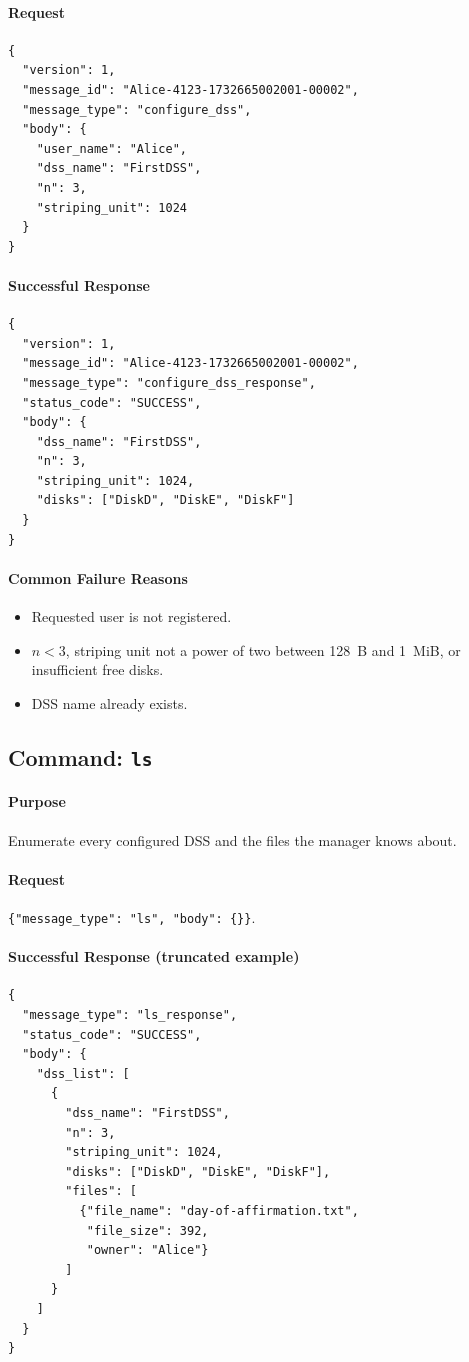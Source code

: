 \documentclass[11pt]{article}
\begin{document}
\paragraph{Request}
\begin{verbatim}
{
  "version": 1,
  "message_id": "Alice-4123-1732665002001-00002",
  "message_type": "configure_dss",
  "body": {
    "user_name": "Alice",
    "dss_name": "FirstDSS",
    "n": 3,
    "striping_unit": 1024
  }
}
\end{verbatim}

\paragraph{Successful Response}
\begin{verbatim}
{
  "version": 1,
  "message_id": "Alice-4123-1732665002001-00002",
  "message_type": "configure_dss_response",
  "status_code": "SUCCESS",
  "body": {
    "dss_name": "FirstDSS",
    "n": 3,
    "striping_unit": 1024,
    "disks": ["DiskD", "DiskE", "DiskF"]
  }
}
\end{verbatim}

\paragraph{Common Failure Reasons}
\begin{itemize}
  \item Requested user is not registered.
  \item $n < 3$, striping unit not a power of two between 128~B and 1~MiB, or insufficient free disks. 
  \item DSS name already exists.
\end{itemize}

\subsection{Command: \texttt{ls}}
\paragraph{Purpose} Enumerate every configured DSS and the files the manager knows about.

\paragraph{Request} \texttt{\{"message\_type": "ls", "body": \{\}\}}.

\paragraph{Successful Response (truncated example)}
\begin{verbatim}
{
  "message_type": "ls_response",
  "status_code": "SUCCESS",
  "body": {
    "dss_list": [
      {
        "dss_name": "FirstDSS",
        "n": 3,
        "striping_unit": 1024,
        "disks": ["DiskD", "DiskE", "DiskF"],
        "files": [
          {"file_name": "day-of-affirmation.txt",
           "file_size": 392,
           "owner": "Alice"}
        ]
      }
    ]
  }
}
\end{verbatim}
\end{document}
